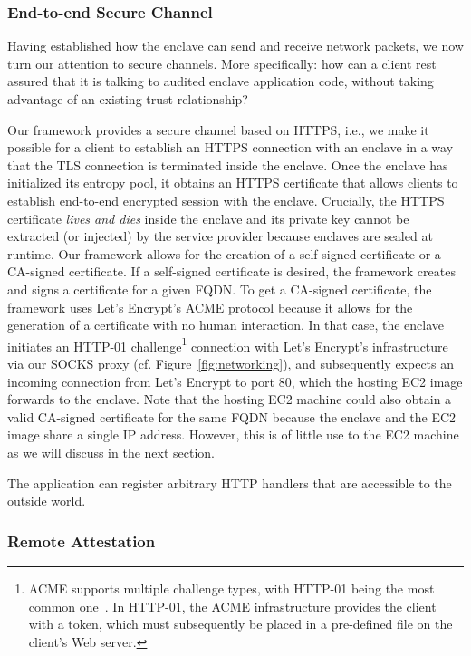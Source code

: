 \subsubsection{End-to-end Secure Channel}
\label{sec:cert}

Having established how the enclave can send and receive network packets, we now
turn our attention to secure channels.  More specifically: how can a client rest
assured that it is talking to audited enclave application code, without taking
advantage of an existing trust relationship?

Our framework provides a secure channel based on HTTPS, i.e., we make it
possible for a client to establish an HTTPS connection with an enclave in a way
that the TLS connection is terminated inside the enclave.  Once the enclave has
initialized its entropy pool, it obtains an HTTPS certificate that allows
clients to establish end-to-end encrypted session with the enclave.  Crucially,
the HTTPS certificate \emph{lives and dies} inside the enclave and its private
key cannot be extracted (or injected) by the service provider because enclaves
are sealed at runtime.  Our framework allows for the creation of a self-signed
certificate or a CA-signed certificate.  If a self-signed certificate is
desired, the framework creates and signs a certificate for a given FQDN.  To get
a CA-signed certificate, the framework uses Let's Encrypt's ACME protocol
because it allows for the generation of a certificate with no human interaction.
In that case, the enclave initiates an HTTP-01 challenge\footnote{ACME supports
multiple challenge types, with HTTP-01 being the most common one~\cite{http-01}.
In HTTP-01, the ACME infrastructure provides the client with a token, which must
subsequently be placed in a pre-defined file on the client's Web server.}
connection with Let's Encrypt's infrastructure via our SOCKS proxy (cf.
Figure~\ref{fig:networking}), and subsequently expects an incoming connection
from Let's Encrypt to port 80, which the hosting EC2 image forwards to the
enclave.  Note that the hosting EC2 machine could also obtain a valid CA-signed
certificate for the same FQDN because the enclave and the EC2 image share a
single IP address.  However, this is of little use to the EC2 machine as we will
discuss in the next section.

The application can register arbitrary HTTP handlers that are accessible to the
outside world.

\subsubsection{Remote Attestation}
\label{sec:attestation}


